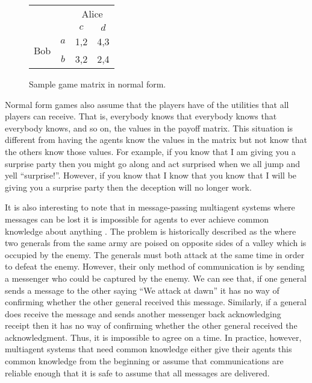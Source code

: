 \begin{SCfigure}
  \begin{minipage}{1.0\linewidth}
    \begin{center}
      \renewcommand\arraystretch{1.5}
      \begin{tabular}{cc|c|c|}
        &    &\multicolumn{2}{c}{Alice} \\ 
        &      &$c$&$d$ \\ \cline{1-4}
        \multirow{2}{2em}{Bob}
        & $a$  &1,2 &4,3 \\ \cline{2-4}
        & $b$  &3,2 &2,4 \\ \cline{2-4}
      \end{tabular}
    \end{center}
    \caption{Sample game matrix in normal form.}
    \label{fig:stanform}
  \end{minipage}
\end{SCfigure}

Normal form games also assume that the players have  of the utilities that all players can receive. That is,
everybody knows that everybody knows that everybody knows, and so on,
the values in the payoff matrix.   This situation is different from having the agents know
the values in the matrix but not know that the others know those
values. For example, if you know that I am giving you a surprise party
then you might go along and act surprised when we all jump and yell
``surprise!''. However, if you know that I know that you know that I
will be giving you a surprise party then the deception will no longer
work.

It is also interesting to note that in message-passing multiagent
systems where messages can be lost it is impossible for agents to ever
achieve common knowledge about anything
\cite{reasoning:about:knowledge}. The problem is historically
described as the  where two generals
from the same army are poised on opposite sides of a valley which is
occupied by the enemy. The generals must both attack at the same time
in order to defeat the enemy. However, their only method of
communication is by sending a messenger who could be captured by the
enemy. We can see that, if one general sends a message to the other
saying ``We attack at dawn'' it has no way of confirming whether the
other general received this message. Similarly, if a general does
receive the message and sends another messenger back acknowledging
receipt then it has no way of confirming whether the other general
received the acknowledgment. Thus, it is impossible to agree on a
time. In practice, however, multiagent systems that need common
knowledge either give their agents this common knowledge from the
beginning or assume that communications are reliable enough that it is
safe to assume that all messages are delivered.

